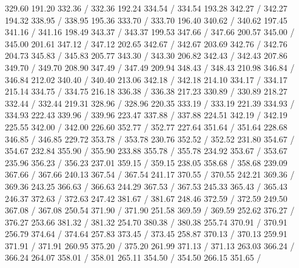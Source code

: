 { 329.60 191.20 332.36 /
 332.36 192.24 334.54 /
 334.54 193.28 342.27 /
 342.27 194.32 338.95 /
 338.95 195.36 333.70 /
 333.70 196.40 340.62 /
 340.62 197.45 341.16 /
 341.16 198.49 343.37 /
 343.37 199.53 347.66 /
 347.66 200.57 345.00 /
 345.00 201.61 347.12 /
 347.12 202.65 342.67 /
 342.67 203.69 342.76 /
 342.76 204.73 345.83 /
 345.83 205.77 343.30 /
 343.30 206.82 342.43 /
 342.43 207.86 349.70 /
 349.70 208.90 347.49 /
 347.49 209.94 348.43 /
 348.43 210.98 346.84 /
 346.84 212.02 340.40 /
 340.40 213.06 342.18 /
 342.18 214.10 334.17 /
 334.17 215.14 334.75 /
 334.75 216.18 336.38 /
 336.38 217.23 330.89 /
 330.89 218.27 332.44 /
 332.44 219.31 328.96 /
 328.96 220.35 333.19 /
 333.19 221.39 334.93 /
 334.93 222.43 339.96 /
 339.96 223.47 337.88 /
 337.88 224.51 342.19 /
 342.19 225.55 342.00 /
 342.00 226.60 352.77 /
 352.77 227.64 351.64 /
 351.64 228.68 346.85 /
 346.85 229.72 353.78 /
 353.78 230.76 352.52 /
 352.52 231.80 354.67 /
 354.67 232.84 355.90 /
 355.90 233.88 355.78 /
 355.78 234.92 353.67 /
 353.67 235.96 356.23 /
 356.23 237.01 359.15 /
 359.15 238.05 358.68 /
 358.68 239.09 367.66 /
 367.66 240.13 367.54 /
 367.54 241.17 370.55 /
 370.55 242.21 369.36 /
 369.36 243.25 366.63 /
 366.63 244.29 367.53 /
 367.53 245.33 365.43 /
 365.43 246.37 372.63 /
 372.63 247.42 381.67 /
 381.67 248.46 372.59 /
 372.59 249.50 367.08 /
 367.08 250.54 371.90 /
 371.90 251.58 369.59 /
 369.59 252.62 376.27 /
 376.27 253.66 381.32 /
 381.32 254.70 380.38 /
 380.38 255.74 370.91 /
 370.91 256.79 374.64 /
 374.64 257.83 373.45 /
 373.45 258.87 370.13 /
 370.13 259.91 371.91 /
 371.91 260.95 375.20 /
 375.20 261.99 371.13 /
 371.13 263.03 366.24 /
 366.24 264.07 358.01 /
 358.01 265.11 354.50 /
 354.50 266.15 351.65 /
}
